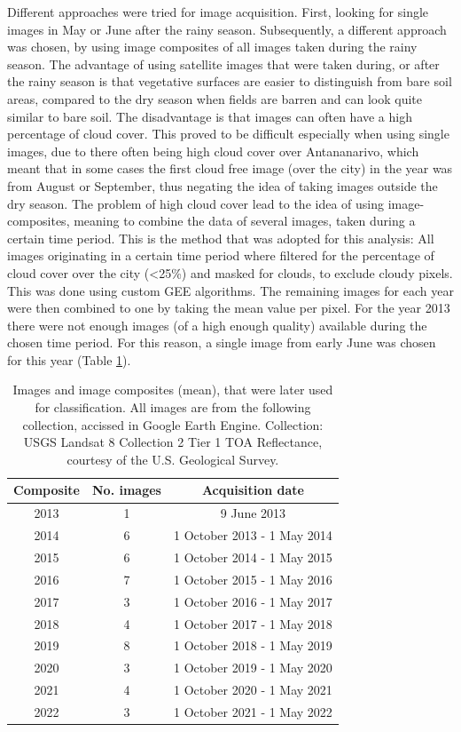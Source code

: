\documentclass[11pt, A4, oneside]{report}
\begin{document}
Different approaches were tried for image acquisition. First, looking for single images in May or June after the rainy season. Subsequently, a different approach was chosen, by using image composites of all images taken during the rainy season. The advantage of using satellite images that were taken during, or after the rainy season is that vegetative surfaces are easier to distinguish from bare soil areas, compared to the dry season when fields are barren and can look quite similar to bare soil. The disadvantage is that images can often have a high percentage of cloud cover. This proved to be difficult especially when using single images, due to there often being high cloud cover over Antananarivo, which meant that in some cases the first cloud free image (over the city) in the year was from August or September, thus negating the idea of taking images outside the dry season. The problem of high cloud cover lead to the idea of using image-composites, meaning to combine the data of several images, taken during a certain time period.
This is the method that was adopted for this analysis:
All images originating in a certain time period where filtered for the percentage of cloud cover over the city (<25\%) and  masked for clouds, to exclude cloudy pixels. This was done using custom GEE algorithms. The remaining images for each year were then combined to one by taking the mean value per pixel. For the year 2013 there were not enough images (of a high enough quality) available during the chosen time period. For this reason, a single image from early June was chosen for this year (Table \ref{tab:imcom}).
\begin{table}[H]
    \centering
    \caption{Images and image composites (mean), that were later used for classification. All images are from the following collection, accissed in Google Earth Engine. Collection: USGS Landsat 8 Collection 2 Tier 1 TOA Reflectance, courtesy of the U.S. Geological Survey.}
    \label{tab:imcom}
    \begin{tabular}{ccc}
    \hline
        Composite & No. images & Acquisition date\\
    \hline
         2013 & 1 & 9 June 2013\\
         2014 & 6 & 1 October 2013 - 1 May 2014\\
         2015 & 6 & 1 October 2014 - 1 May 2015\\
         2016 & 7 & 1 October 2015 - 1 May 2016\\
         2017 & 3 & 1 October 2016 - 1 May 2017\\
         2018 & 4 & 1 October 2017 - 1 May 2018\\
         2019 & 8 & 1 October 2018 - 1 May 2019\\
         2020 & 3 & 1 October 2019 - 1 May 2020\\
         2021 & 4 & 1 October 2020 - 1 May 2021\\
         2022 & 3 & 1 October 2021 - 1 May 2022\\
         \hline
    \end{tabular}
    
    
\end{table}
\end{document}
